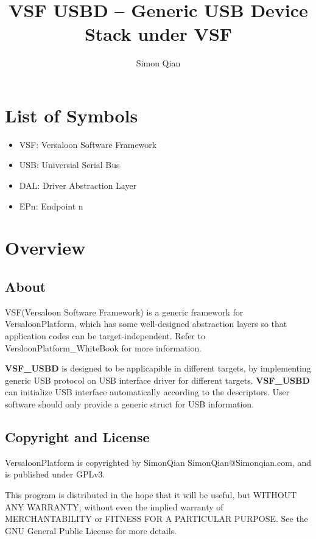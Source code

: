 \documentclass[a4paper,12pt]{book}
\title{VSF USBD -- Generic USB Device Stack under VSF}
\author{Simon Qian}
\date{}
\begin{document}
\dominitoc

\maketitle

\tableofcontents
\listoffigures
\listoftables

\newpage
\chapter*{List of Symbols\hfill} %

\begin{itemize}
\item VSF: Versaloon Software Framework
\item USB: Universial Serial Bus
\item DAL: Driver Abstraction Layer
\item EPn: Endpoint n
\end{itemize}

\chapter{Overview}
\minitoc

\newpage
\section{About}
VSF(Versaloon Software Framework) is a generic framework for VersaloonPlatform, which has some well-designed abstraction layers so that application codes can be target-independent. Refer to VersloonPlatform\_WhiteBook for more information.

\textbf{VSF\_USBD} is designed to be applicapible in different targets, by implementing generic USB protocol on USB interface driver for different targets. \textbf{VSF\_USBD} can initialize USB interface automatically according to the descriptors. User software should only provide a generic struct for USB information.

\newpage
\section{Copyright and License}
VersaloonPlatform is copyrighted by SimonQian SimonQian@Simonqian.com, and is published under GPLv3.

This program is distributed in the hope that it will be useful, but WITHOUT ANY WARRANTY; without even the implied warranty of MERCHANTABILITY or FITNESS FOR A PARTICULAR PURPOSE.  See the GNU General Public License for more details.
\end{document}
